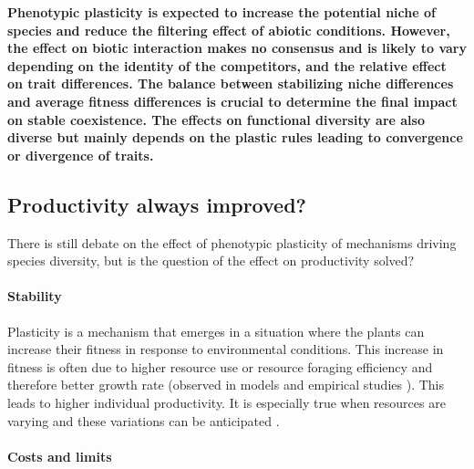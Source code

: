 {%


\textbf{Phenotypic plasticity is expected to increase the potential niche of species and reduce the filtering effect of abiotic conditions. However, the effect on biotic interaction makes no consensus and is likely to vary depending on the identity of the competitors, and the relative effect on trait differences. The balance between stabilizing niche differences and average fitness differences is crucial to determine the final impact on stable coexistence. The effects on functional diversity are also diverse but mainly depends on the plastic rules leading to convergence or divergence of traits.}


\subsection{Productivity always improved?}

There is still debate on the effect of phenotypic plasticity of mechanisms driving species diversity, but is the question of the effect on productivity solved?

\paragraph{Stability}

Plasticity is a mechanism that emerges in a situation where the plants can increase their fitness in response to environmental conditions. This increase in fitness is often due to higher resource use or resource foraging efficiency and therefore better growth rate (observed in models \parencite{maire_plasticity_2013} and empirical studies \parencite{ hamann_evidence_2016}). This leads to higher individual productivity. It is especially true when resources are varying and these variations can be anticipated  \cite{richter_phenotypic_2012}.





\paragraph{Costs and limits}

}
